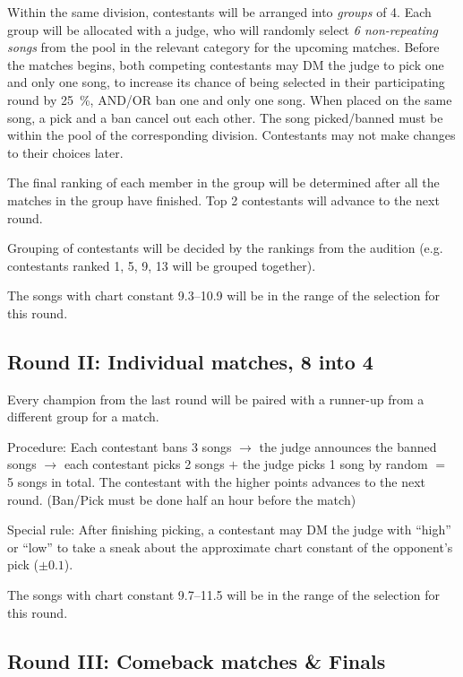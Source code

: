 \documentclass{article}
\newcommand{\alert}[1]{{\color{red} #1}}
\newcommand{\srbgcolor}{red!40}
\newcommand{\specialrule}[1]{\colorbox{\srbgcolor}{\parbox{\textwidth}{#1}}}
\begin{document}
Within the same division,
contestants will be arranged into \emph{groups} of 4.
Each group will be allocated with a judge,
who will randomly select \emph{6 non-repeating songs}
from the pool in the relevant category
for the upcoming matches.
Before the matches begins,
both competing contestants
may DM the judge to pick one and only one song,
to increase its chance of being selected
in their participating round by \qty{25}{\percent},
AND/OR ban one and only one song.
When placed on the same song,
a pick and a ban cancel out each other.
The song picked/banned must be within
the pool of the corresponding division.
Contestants may not make changes to their choices later.

The final ranking of each member in the group will be determined
after all the matches in the group have finished.
Top 2 contestants will advance to the next round.

Grouping of contestants will be decided
by the rankings from the audition
(e.g. contestants ranked 1, 5, 9, 13
will be grouped together).

\alert{
	The songs with chart constant 9.3--10.9
	will be in the range of the selection for this round.
}

\subsection  {Round II: Individual matches, 8 into 4}

Every champion  %
from the last round
will be paired with a runner-up
from a different group for a match.

Procedure: Each contestant bans 3 songs $\rightarrow$
the judge announces the banned songs $\rightarrow$
each contestant picks 2 songs $+$ the judge picks 1 song by random $=$ 5 songs in total.
The contestant with the higher points advances to the next round.
(Ban/Pick must be done half an hour before the match)

\specialrule{
	Special rule: After finishing picking,
	a contestant may DM the judge with ``high'' or ``low''
	to take a sneak about
	the approximate chart constant of the opponent's pick
	($\pm0.1$).
}

\nopagebreak

\alert{
	The songs with chart constant 9.7--11.5
	will be in the range of the selection for this round.
}

\subsection{Round III: Comeback %
	matches \& Finals}
\end{document}
